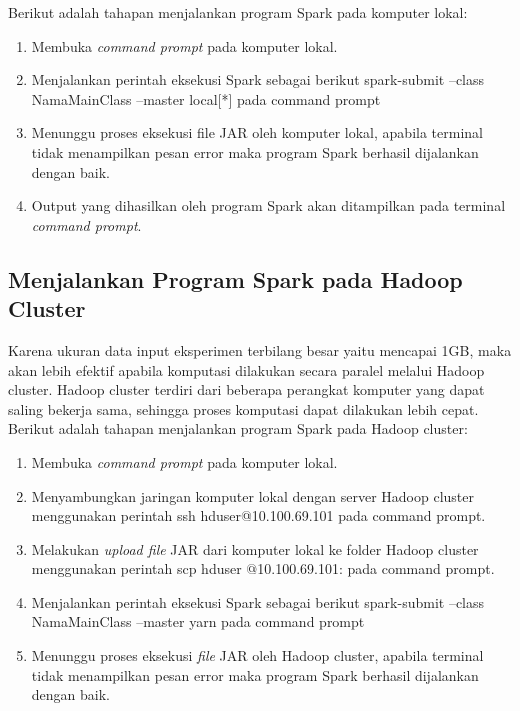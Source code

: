 \noindent Berikut adalah tahapan menjalankan program Spark pada komputer lokal:
\begin{enumerate}
\item Membuka \textit{command prompt} pada komputer lokal.
\item Menjalankan perintah eksekusi Spark sebagai berikut \textsf{spark-submit --class NamaMainClass --master local[*] } pada command prompt
\item Menunggu proses eksekusi file JAR oleh komputer lokal, apabila terminal tidak menampilkan pesan error maka program Spark berhasil dijalankan dengan baik.
\item Output yang dihasilkan oleh program Spark akan ditampilkan pada terminal \textit{command prompt}.
\end{enumerate}

\subsection{Menjalankan Program Spark pada Hadoop Cluster}
Karena ukuran data input eksperimen terbilang besar yaitu mencapai 1GB, maka akan lebih efektif apabila komputasi dilakukan secara paralel melalui Hadoop cluster. Hadoop cluster terdiri dari beberapa perangkat komputer yang dapat saling bekerja sama, sehingga proses komputasi dapat dilakukan lebih cepat.\\

\noindent Berikut adalah tahapan menjalankan program Spark pada Hadoop cluster:
\begin{enumerate}
\item Membuka \textit{command prompt} pada komputer lokal.
\item Menyambungkan jaringan komputer lokal dengan server Hadoop cluster menggunakan perintah \textsf{ssh hduser@10.100.69.101} pada command prompt.
\item Melakukan \textit{upload file} JAR dari komputer lokal ke folder Hadoop cluster menggunakan perintah \textsf{scp  hduser
$@$10.100.69.101:} pada command prompt.
\item Menjalankan perintah eksekusi Spark sebagai berikut \textsf{spark-submit --class NamaMainClass --master yarn } pada command prompt
\item Menunggu proses eksekusi \textit{file} JAR oleh Hadoop cluster, apabila terminal tidak menampilkan pesan error maka program Spark berhasil dijalankan dengan baik.
\end{enumerate}

